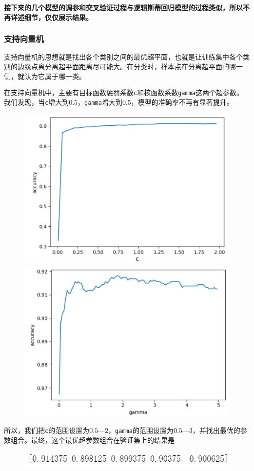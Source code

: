 \documentclass{article}
\begin{document}
\textbf{接下来的几个模型的调参和交叉验证过程与逻辑斯蒂回归模型的过程类似，所以不再详述细节，仅仅展示结果。}

\subsubsection{支持向量机}
支持向量机的思想就是找出各个类别之间的最优超平面，也就是让训练集中各个类别的边缘点离分离超平面距离尽可能大。在分类时，样本点在分离超平面的哪一侧，就认为它属于哪一类。

在支持向量机中，主要有目标函数惩罚系数\lstinline|c|和核函数系数\lstinline|gamma|这两个超参数。我们发现，当\lstinline|c|增大到$0.5$，\lstinline|gamma|增大到$0.5$，模型的准确率不再有显著提升。

\begin{figure}[h]
    \lefting
    \includegraphics[width=0.5\linewidth]{image3.png}
    \label{fig:enter-label}
    \righting
    \includegraphics[width=0.5\linewidth]{image4.png}
    \label{fig:enter-label}
\end{figure}

所以，我们把\lstinline|c|的范围设置为$0.5$—$2$，\lstinline|gamma|的范围设置为$0.5$—$3$，并找出最优的参数组合。最终，这个最优超参数组合在验证集上的结果是
\begin{figure}[h]
    \centering
    \includegraphics[width=0.5\linewidth]{image5.png}
    \label{fig:enter-label}
\end{figure}
\end{document}
